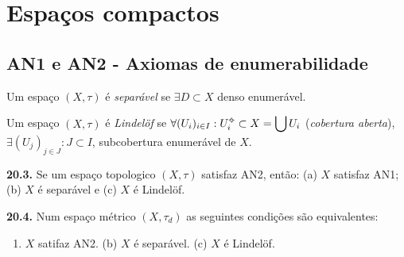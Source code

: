 \section{Espaços compactos}

\subsection*{AN1 e AN2 - Axiomas de enumerabilidade}

\begin{definition}
    Um espaço \((X, \tau)\) é \emph{separável} se \(\exists D \subset X\) denso enumerável.  
\end{definition}

 \begin{definition}
    Um espaço \((X,\tau)\) é \emph{Lindelöf} se \(\forall (U_i)_{i\in I}: U_i\ab \subset  X = \displaystyle\bigcup U_i\) (\emph{cobertura aberta}), \(\exists (U_j)_{j\in J} : J \subset I\), subcobertura enumerável de \(X\).   
\end{definition}   

\hypertarget{prop203}{}
\begin{proposition}
    \textbf{20.3.} Se um espaço topologico \((X,\tau)\) satisfaz AN2, então: (a) \(X\) satisfaz AN1; (b) \(X\) é separável e (c) \(X\) é Lindelöf. 
\end{proposition}


\begin{proposition}
    \textbf{20.4.} Num espaço métrico \((X,\tau_d)\) as seguintes condições são equivalentes: 
    \vspace{-0.2cm}
    \begin{enumerate}[label = (\alph*), left = 0.6cm]
        \item \(X\) satifaz AN2. \hfill (b) \(X\) é separável. \hfill (c) \(X\) é Lindelöf. 
    \end{enumerate}
\end{proposition}


